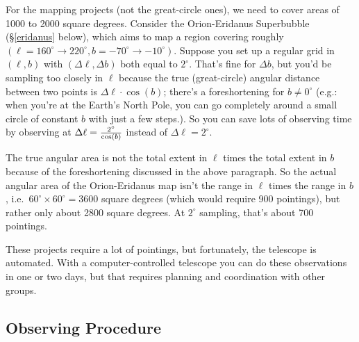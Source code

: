 \documentclass[psfig,preprint]{aastex}
\begin{document}
For the mapping projects (not the great-circle ones), we need to cover
areas of 1000 to 2000 square degrees. Consider the Orion-Eridanus
Superbubble (\S \ref{eridanus} below), which aims to map a region
covering roughly $(\ell=160^\circ \rightarrow 220^\circ, b=-70^\circ
\rightarrow -10^\circ)$. Suppose you set up a regular grid in
$(\ell,b)$ with $(\Delta \ell, \Delta b)$ both equal to
$2^\circ$. That's fine for $\Delta b$, but you'd be sampling too closely
in $\ell$ because the true (great-circle) angular distance
between two points is $\Delta \ell \cdot \cos(b)$; there's a
foreshortening for $b \neq 0^\circ$ (e.g.: when you're at the Earth's
North Pole, you can go completely around a small circle of constant $b$
with just a few steps.). So you can save lots of observing time by
observing at $\Delta \ell = {2^\circ \over \cos(b)}$ instead of $\Delta
\ell = 2^\circ$.

The true angular area is not the total extent in $\ell$ times the total
extent in $b$ because of the foreshortening discussed in the above
paragraph. So the actual angular area of the Orion-Eridanus map
isn't the range in $\ell$ times the range in $b$, i.e.\ $60^\circ
\times 60^\circ = 3600$ square degrees (which would require 900
pointings), but rather only about 2800 square degrees.  At $2^\circ$
sampling, that's about 700 pointings.

These projects require a lot of pointings,
but fortunately, the telescope is automated. With a
computer-controlled telescope you can do these observations in one
or two days, but that requires planning and coordination with other
groups.

\subsection{Observing Procedure} \label{mappingcommands}
\end{document}
